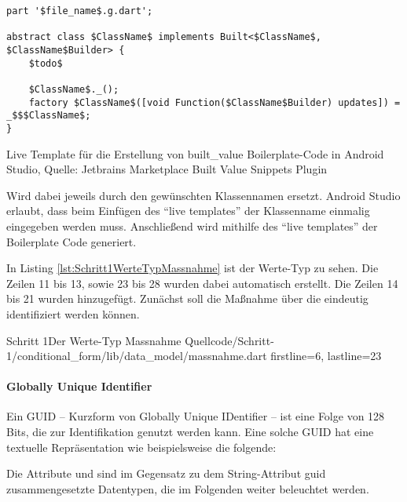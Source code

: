 \ifincludeall
  \begin{listing}[h]
    \begin{verbatim}
part '$file_name$.g.dart';

abstract class $ClassName$ implements Built<$ClassName$, $ClassName$Builder> {
    $todo$
    
    $ClassName$._();
    factory $ClassName$([void Function($ClassName$Builder) updates]) = _$$$ClassName$;
}

\end{verbatim}
    \caption[built_value Live Template]{Live Template für die Erstellung von built_value Boilerplate-Code in Android Studio, Quelle: Jetbrains Marketplace Built Value Snippets Plugin}
    \label{lst:BuiltValueLiveTemplate}
  \end{listing}
\fi

 Wird dabei jeweils durch den gewünschten Klassennamen ersetzt.
Android Studio erlaubt, dass beim Einfügen des \enquote{live templates} der Klassenname einmalig eingegeben werden muss.  Anschließend wird mithilfe des \enquote{live templates} der Boilerplate Code generiert.

In Listing \ref{lst:Schritt1WerteTypMassnahme} ist der Werte-Typ  zu sehen.
Die Zeilen 11 bis 13, sowie 23 bis 28 wurden dabei automatisch erstellt.
Die Zeilen 14 bis 21 wurden hinzugefügt.
Zunächst soll die Maßnahme über die  eindeutig identifiziert werden können.

\begin{alexlisting}{Schritt 1}{Der Werte-Typ Massnahme}
  {Quellcode/Schritt-1/conditional_form/lib/data_model/massnahme.dart}
  {firstline=6, lastline=23}
  \label{lst:Schritt1WerteTypMassnahme}
\end{alexlisting}

\paragraph{Globally Unique Identifier}
Ein GUID – Kurzform von Globally Unique IDentifier – ist  eine Folge von 128 Bits, die zur Identifikation genutzt werden kann.
Eine solche GUID hat eine textuelle Repräsentation wie beispielsweise die folgende: 


Die Attribute  und  sind im Gegensatz zu dem String-Attribut guid zusammengesetzte Datentypen, die im Folgenden weiter beleuchtet werden.

